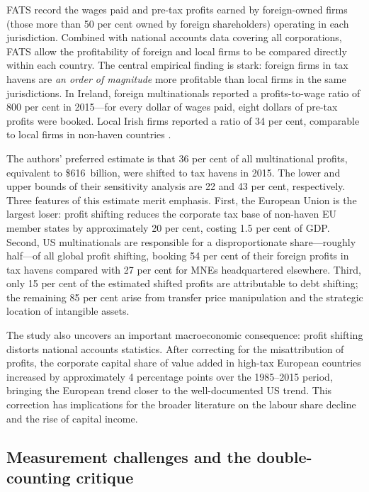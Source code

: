 \documentclass[12pt,a4paper]{article}
\begin{document}
FATS record the wages paid and pre-tax profits earned by foreign-owned firms (those more than 50 per cent owned by foreign shareholders) operating in each jurisdiction.
Combined with national accounts data covering all corporations, FATS allow the profitability of foreign and local firms to be compared directly within each country.
The central empirical finding is stark: foreign firms in tax havens are \emph{an order of magnitude} more profitable than local firms in the same jurisdictions.
In Ireland, foreign multinationals reported a profits-to-wage ratio of 800 per cent in 2015---for every dollar of wages paid, eight dollars of pre-tax profits were booked.
Local Irish firms reported a ratio of 34 per cent, comparable to local firms in non-haven countries \parencite{torslov2022}.

The authors' preferred estimate is that 36 per cent of all multinational profits, equivalent to \$616~billion, were shifted to tax havens in 2015.
The lower and upper bounds of their sensitivity analysis are 22 and 43 per cent, respectively.
Three features of this estimate merit emphasis.
First, the European Union is the largest loser: profit shifting reduces the corporate tax base of non-haven EU member states by approximately 20 per cent, costing 1.5 per cent of GDP.
Second, US multinationals are responsible for a disproportionate share---roughly half---of all global profit shifting, booking 54 per cent of their foreign profits in tax havens compared with 27 per cent for MNEs headquartered elsewhere.
Third, only 15 per cent of the estimated shifted profits are attributable to debt shifting; the remaining 85 per cent arise from transfer price manipulation and the strategic location of intangible assets.

The \textcite{torslov2022} study also uncovers an important macroeconomic consequence: profit shifting distorts national accounts statistics.
After correcting for the misattribution of profits, the corporate capital share of value added in high-tax European countries increased by approximately 4 percentage points over the 1985--2015 period, bringing the European trend closer to the well-documented US trend.
This correction has implications for the broader literature on the labour share decline and the rise of capital income.

\subsection{Measurement challenges and the double-counting critique}
\end{document}
